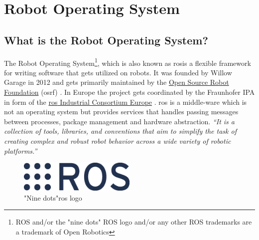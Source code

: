 
\chapter{Robot Operating System\authorA} \label{ref:ros}

\section{What is the Robot Operating System?}
The Robot Operating System\footnote{ROS and/or the "nine dots" ROS logo and/or any other ROS trademarks are a trademark of Open Robotics}, which is also known as \gls{ros}\texttrademark  is a flexible framework for writing software that gets utilized on robots. It was founded by Willow Garage in 2012 and gets primarily maintained by the \href{https://www.openrobotics.org/}{Open Source Robot Foundation} (\gls{osrf}) \cite{osrf}. In Europe the project gets coordinated by the Fraunhofer IPA in form of the \href{https://rosindustrial.org/ric-eu}{\gls{ros} Industrial Consortium Europe} \cite{rosice}. \gls{ros} is a middle-ware which is not an operating system but provides services that handles passing messages between processes, package management and hardware abstraction. \emph{\enquote{It is a collection of tools, libraries, and conventions that aim to simplify the task of creating complex and robust robot behavior across a wide variety of robotic platforms.}} \cite{aboutros} \newline
\begin{figure}[h]
	\centering
	\includegraphics[width=0.5\textwidth]{./media/images/ros_logo.eps}
  	\caption{"Nine dots"\texttrademark  \gls{ros} logo}
  	\label{rosstructure}
\end{figure}

